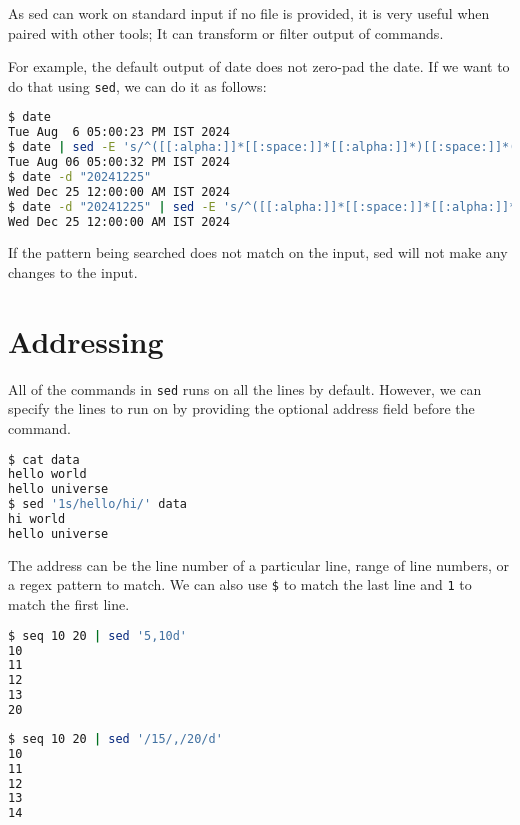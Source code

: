 As sed can work on standard input if no file is provided, it is very useful when paired with other tools; It can transform or filter output of commands.

For example, the default output of date does not zero-pad the date.
If we want to do that using \lstinline|sed|, we can do it as follows:

\begin{lstlisting}[language=bash]
$ date
Tue Aug  6 05:00:23 PM IST 2024
$ date | sed -E 's/^([[:alpha:]]*[[:space:]]*[[:alpha:]]*)[[:space:]]*([[:digit:]])[[:space:]]/\1 0\2 /'
Tue Aug 06 05:00:32 PM IST 2024
$ date -d "20241225"
Wed Dec 25 12:00:00 AM IST 2024
$ date -d "20241225" | sed -E 's/^([[:alpha:]]*[[:space:]]*[[:alpha:]]*)[[:space:]]*([[:digit:]])[[:space:]]/\1 0\2 /'
Wed Dec 25 12:00:00 AM IST 2024
\end{lstlisting}

If the pattern being searched does not match on the input, sed will not make any changes to the input.

\section{Addressing}

All of the commands in \lstinline|sed| runs on all the lines by default.
However, we can specify the lines to run on by providing the optional address field before the command.

\begin{lstlisting}[language=bash]
$ cat data
hello world
hello universe
$ sed '1s/hello/hi/' data
hi world
hello universe
\end{lstlisting}

The address can be the line number of a particular line, range of line numbers, or a regex pattern to match. We can also use \lstinline|$| to match the last line and \lstinline|1| to match the first line.

\begin{lstlisting}[language=bash]
$ seq 10 20 | sed '5,10d'
10
11
12
13
20
\end{lstlisting}

\begin{lstlisting}[language=bash]
$ seq 10 20 | sed '/15/,/20/d'
10
11
12
13
14
\end{lstlisting}

